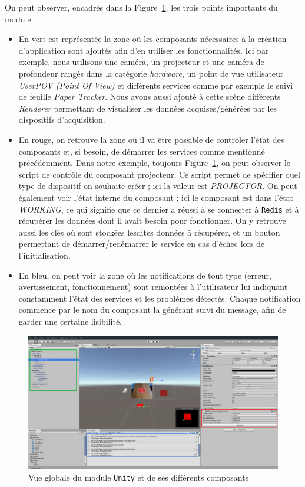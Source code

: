 On peut observer, encadrés dans la Figure~\ref{fig:unity:plugin}, les trois points importants du module. 
\begin{itemize}
\item En vert est représentée la zone où les composants nécessaires à la création d'application sont ajoutés afin d'en utiliser les fonctionnalités. Ici par exemple, nous utilisons une caméra, un projecteur et une caméra de profondeur rangés dans la catégorie \emph{hardware}, un point de vue utilisateur \emph{UserPOV (Point Of View)} et différents services comme par exemple le suivi de feuille \emph{Paper Tracker}. Nous avons aussi ajouté à cette scène différents \emph{Renderer} permettant de visualiser les données acquises/générées par les dispositifs d'acquisition.
\item En rouge, on retrouve la zone où il va être possible de contrôler l'état des composants et, si besoin, de démarrer les services comme mentionné précédemment. Dans notre exemple, toujours Figure~\ref{fig:unity:plugin}, on peut observer le script de contrôle du composant projecteur. Ce script permet de spécifier quel type de dispositif on souhaite créer ; ici la valeur est \emph{PROJECTOR}. On peut également voir l'état interne du composant ; ici le composant est dans l'état \emph{WORKING}, ce qui signifie que ce dernier a réussi à se connecter à \texttt{Redis} et à récupérer les données dont il avait besoin pour fonctionner. On y retrouve aussi les clés où sont stockées lesdites données à récupérer, et un bouton permettant de démarrer/redémarrer le service en cas d'échec lors de l'initialisation.
\item En bleu, on peut voir la zone où les notifications de tout type (erreur, avertissement, fonctionnement) sont remontées à l'utilisateur lui indiquant constamment l'état des services et les problèmes détectés. Chaque notification commence par le nom du composant la générant suivi du message, afin de garder une certaine lisibilité.
\end{itemize}

\begin{figure}[H]
\centering
\includegraphics[width=\linewidth]{images/unity-plugin}
\caption{Vue globale du module \texttt{Unity} et de ses différents composants}
\label{fig:unity:plugin}
\end{figure}

